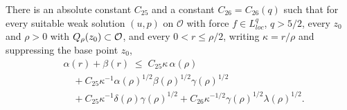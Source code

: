 \documentclass[11pt,reqno]{amsart}
\begin{document}
\begin{lemma}
\label{lem:caccioppoli}
There is an absolute constant $C_{25}$ and a constant $C_{26}=C_{26}(q)$ such
that for every suitable weak solution $(u,p)$ on $\mathcal{O}$ with force
$f\in L^{q}_{loc}$, $q>5/2$, every $z_{0}$ and $\rho>0$ with
$Q_{\rho}(z_{0})\subset\mathcal{O}$, and every $0<r\le\rho/2$, writing
$\kappa=r/\rho$ and suppressing the base point $z_{0}$,
\begin{equation}\label{eq:caccioppoli}\begin{aligned}
  &\alpha(r)+\beta(r)\;\le\;
    C_{25}\kappa\,\alpha(\rho)
   \\ &\quad+C_{25}\kappa^{-1}\alpha(\rho)^{1/2}\beta(\rho)^{1/2}\gamma(\rho)^{1/2}
   \\ &\quad+C_{25}\kappa^{-1}\delta(\rho)\gamma(\rho)^{1/2}
   +C_{26}\kappa^{-1/2}\gamma(\rho)^{1/2}\lambda(\rho)^{1/2}.
\end{aligned}\end{equation}
\end{lemma}
\end{document}
